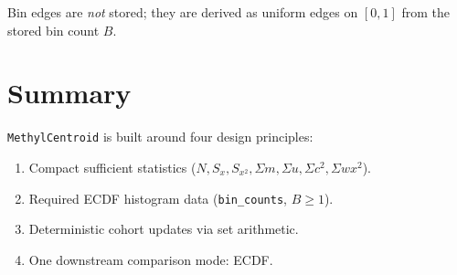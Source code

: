 \documentclass[11pt]{article}
\begin{document}
Bin edges are \emph{not} stored; they are derived as uniform edges on
\([0,1]\) from the stored bin count \(B\).

\section{Summary}

\texttt{MethylCentroid} is built around four design principles:

\begin{enumerate}
  \item Compact sufficient statistics (\(N, S_x, S_{x^2}, \Sigma m, \Sigma u,
        \Sigma c^2, \Sigma w x^2\)).
  \item Required ECDF histogram data (\texttt{bin\_counts}, \(B \geq 1\)).
  \item Deterministic cohort updates via set arithmetic.
  \item One downstream comparison mode: ECDF.
\end{enumerate}
\end{document}
